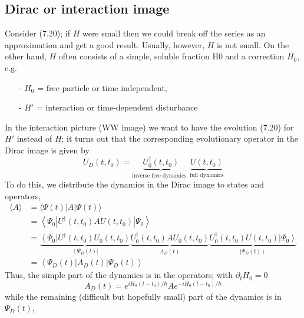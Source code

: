 \subsection{Dirac or interaction image}
Consider (7.20); if $H$ were small then we could break off the series as an approximation and get a good result. Usually, however, $H$ is not small. On the other hand, $H$ often consists of a simple, soluble fraction H0 and a correction $ H_0$, e.g.
\begin{enumerate}
    \item[-] $H_0$ = free particle or time independent,
    \item[-] $H'$ = interaction or time-dependent disturbance 
\end{enumerate}
In the interaction picture (WW image) we want to have the evolution (7.20) for $H'$ instead of $H$; it turns out that the corresponding evolutionary operator in the Dirac image is given by
\begin{equation}
    U_{D}\left(t, t_{0}\right)=\underbrace{U_{0}^{\dagger}\left(t, t_{0}\right)}_{\text {inverse free dynamics.  }}\underbrace{U(t,t_0)}_{\text{full dynamics}}
    \end{equation}
To do this, we distribute the dynamics in the Dirac image to states and operators,
\begin{equation}
\begin{aligned}\langle A\rangle &=\langle\Psi(t)|A| \Psi(t)\rangle \\ &=\left\langle\Psi_{0}\left|U^{\dagger}\left(t, t_{0}\right) A U\left(t, t_{0}\right)\right| \Psi_{0}\right\rangle \\ &=\underbrace{\left\langle\Psi_{0}\right| U^{\dagger}\left(t, t_{0}\right) U_{0}\left(t, t_{0}\right)}_{\left\langle\Psi_{D}(t)\right|} \underbrace{U_{0}^{\dagger}\left(t, t_{0}\right) A U_{0}\left(t, t_{0}\right)}_{A_{D}(t)} \underbrace{U_{0}^{\dagger}\left(t, t_{0}\right) U\left(t, t_{0}\right)\left|\Psi_{0}\right\rangle}_{\left|\Psi_{D}(t)\right\rangle} \\ &=\left\langle\Psi_{D}(t)\left|A_{D}(t)\right| \Psi_{D}(t)\right\rangle \end{aligned}
\end{equation}
Thus, the simple part of the dynamics is in the operators; with $\partial_tH_0 = 0$
\begin{equation}
    A_{D}(t)=e^{i H_{0}\left(t-t_{0}\right) / \hbar} A e^{-i H_{0}\left(t-t_{0}\right) / \hbar}
    \end{equation}
while the remaining (difficult but hopefully small) part of the dynamics is in $\Psi_D (t)$,

